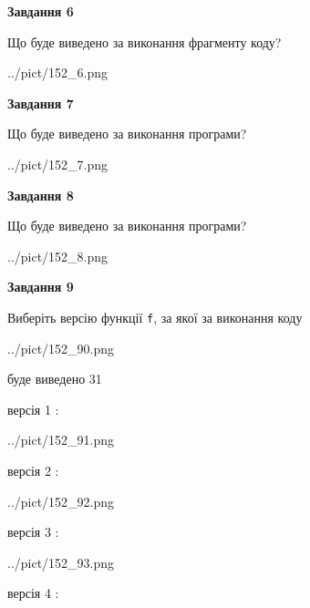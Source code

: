 \documentclass[12pt, ukrainian]{article}
\def\code#1{\Verb!#1!}
\begin{document}
{\begin {large}
{\begin {center}\textbf{Завдання 6}\end {center}}

Що буде виведено за виконання фрагменту коду?\par
\begin{center}
	{../pict/152_6.png}
\end{center}
\newpage

{\begin {center}\textbf{Завдання 7}\end {center}}

Що буде виведено за виконання програми?\par
\begin{center}
	{../pict/152_7.png}
\end{center}
\newpage

{\begin {center}\textbf{Завдання 8}\end {center}}

Що буде виведено за виконання програми?\par
\begin{center}
	{../pict/152_8.png}
\end{center}
\newpage

{\begin {center}\textbf{Завдання 9}\end {center}}

Виберіть версію функції \code{f}, за якої за виконання коду
\begin{center}
	{../pict/152_90.png}
\end{center}
буде виведено 31

\vspace{5mm}
версія 1 :

\begin{center}
	{../pict/152_91.png}
\end{center}
версія 2 :

\begin{center}
	{../pict/152_92.png}
\end{center}
версія 3 :

\begin{center}
	{../pict/152_93.png}
\end{center}
версія 4 :


\end{large}}
\end{document}
